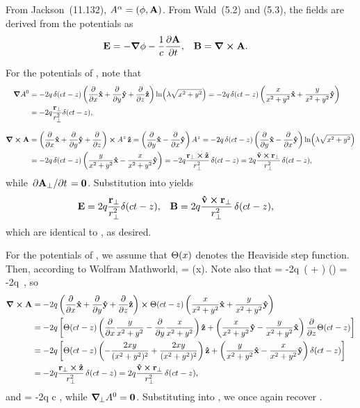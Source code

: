 \begin{solution}
	From Jackson~(11.132), $A^\alpha = (\phi, \vb{A})$.  From Wald~(5.2) and (5.3), the fields are derived from the potentials as
	\begin{align} \label{potentials}
		\vb{E} &= -\grad\phi - \frac{1}{c} \pdv{\vb{A}}{t}, &
		\vb{B} &= \grad \cross \vb{A}.
	\end{align}
	
	For the potentials of , note that
	\begin{align*}
		\grad A^0 &= -2q \,\delta(ct - z) \left( \pdv{x} \vb{\hat{x}} + \pdv{y} \vb{\hat{y}} + \pdv{z} \vb{\hat{z}} \right) \ln( \lambda \sqrt{x^2 + y^2})
		= -2q \,\delta(ct - z) \left( \frac{x}{x^2 + y^2} \vb{\hat{x}} + \frac{y}{x^2 + y^2}\vb{\hat{y}} \right) \\
		&= -2q \frac{\vb{r}_\perp}{r_\perp^2} \delta(ct - z), \\[2ex]
		\grad \cross \vb{A} &= \left( \pdv{x} \vb{\hat{x}} + \pdv{y} \vb{\hat{y}} + \pdv{z} \right) \cross A^z \,\vb{\hat{z}}
		= \left( \pdv{y} \vb{\hat{x}} - \pdv{x} \vb{\hat{y}} \right) A^z
		= -2q \,\delta(ct - z) \left( \pdv{y} \vb{\hat{x}} - \pdv{x} \vb{\hat{y}} \right) \ln( \lambda \sqrt{x^2 + y^2}) \\
		&= -2q \,\delta(ct - z) \left( \frac{y}{x^2 + y^2} \vb{\hat{x}} - \frac{x}{x^2 + y^2} \vb{\hat{y}} \right)
		= -2q \frac{\vb{r}_\perp \cross \vb{\hat{z}}}{r_\perp^2} \,\delta(ct - z)
		= 2q \frac{\vb{\hat{v}} \cross \vb{r}_\perp}{r_\perp^2} \,\delta(ct - z),
	\end{align*}
	while $\pdv*{\vb{A}_\perp}{t} = \mathbf{0}$.  Substitution into  yields
	\begin{align*}
		\vb{E} &= 2q \frac{\vb{r}_\perp}{r_\perp^2} \delta(ct - z), &
		\vb{B} &= 2q \frac{\vb{\hat{v}} \cross \vb{r}_\perp}{r_\perp^2} \,\delta(ct - z),
	\end{align*}
	which are identical to , as desired.
	
	For the potentials of , we assume that $\Theta(x)$ denotes the Heaviside step function.  Then, according to Wolfram Mathworld,
	\beq
		 = \del(x).
	\eeq
	Note also that
	\beq
		\vAperp = -2q \,\Thtctz \left(  \xh +  \yh \right) \ln(\lam {})
		= -2q  \,\Thtctz,
	\eeq
	so
	\begin{align*}
		\grad \cross \vb{A} &= -2q \left( \pdv{x} \vb{\hat{x}} + \pdv{y} \vb{\hat{y}} + \pdv{z} \vb{\hat{z}} \right) \cross \Theta(ct - z) \left( \frac{x}{x^2 + y^2} \vb{\hat{x}} + \frac{y}{x^2 + y^2} \vb{\hat{y}} \right) \\
		&= -2q \left[ \Theta(ct - z) \left( \pdv{x} \frac{y}{x^2 + y^2} - \pdv{y} \frac{x}{x^2 + y^2} \right) \vb{\hat{z}} + \left( \frac{x}{x^2 + y^2} \vb{\hat{y}} - \frac{y}{x^2 + y^2} \vb{\hat{x}} \right) \pdv{z} \Theta(ct - z) \right] \\
		&= -2q \left[ \Theta(ct - z) \left( -\frac{2 x y}{(x^2 + y^2)^2} + \frac{2 x y}{(x^2 + y^2)^2} \right) \vb{\hat{z}} + \left( \frac{y}{x^2 + y^2} \vb{\hat{x}} - \frac{x}{x^2 + y^2} \vb{\hat{y}} \right) \delta(ct - z) \right] \\
		&= -2q \frac{\vb{r}_\perp \cross \vb{\hat{z}}}{r_\perp^2} \,\delta(ct - z)
		= 2q \frac{\vb{\hat{v}} \cross \vb{r}_\perp}{r_\perp^2} \,\delta(ct - z),
	\end{align*}
	and
	\beq
		 = -2q c  \delctz,
	\eeq
	while $\grad_{\!\perp}A^0 = \mathbf{0}$.  Substituting into , we once again recover .
	

\end{solution}
